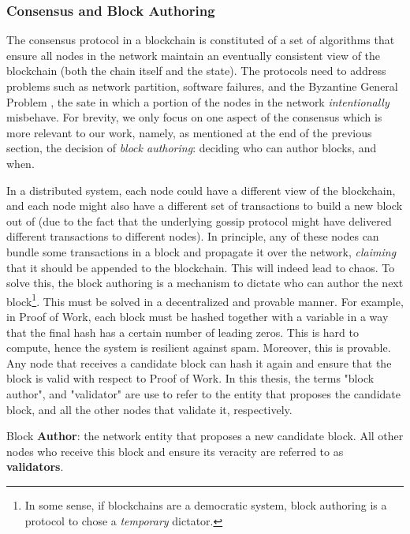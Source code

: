 \subsubsection{Consensus and Block Authoring} \label{chap_bg:subsec:consensus_authorship}

The consensus protocol in a blockchain is constituted of a set of algorithms that ensure all nodes
in the network maintain an eventually consistent view of the blockchain (both the chain itself and
the state). The protocols need to address problems such as network partition, software failures, and
the Byzantine General Problem \cite{lamportByzantineGeneralsProblem1982}, the sate in which a
portion of the nodes in the network \textit{intentionally} misbehave. For brevity, we only focus on
one aspect of the consensus which is more relevant to our work, namely, as mentioned at the end of
the previous section, the decision of \textit{block authoring}: deciding who can author blocks, and
when.

In a distributed system, each node could have a different view of the blockchain, and each node
might also have a different set of transactions to build a new block out of (due to the fact that
the underlying gossip protocol might have delivered different transactions to different nodes). In
principle, any of these nodes can bundle some transactions in a block and propagate it over the
network, \textit{claiming} that it should be appended to the blockchain. This will indeed lead to
chaos. To solve this, the block authoring is a mechanism to dictate who can author the next
block\footnote{In some sense, if blockchains are a democratic system, block authoring is a protocol
to chose a \textit{temporary} dictator.}. This must be solved in a decentralized and provable
manner. For example, in Proof of Work, each block must be hashed together with a variable in a way
that the final hash has a certain number of leading zeros. This is hard to compute, hence the system
is resilient against spam. Moreover, this is provable. Any node that receives a candidate block can
hash it again and ensure that the block is valid with respect to Proof of Work. In this thesis, the
terms "block author", and "validator" are use to refer to the  entity that proposes the candidate
block, and all the other nodes that validate it, respectively.


\begin{definition} \label{def:auhtor_validator} Block \textbf{Author}: the network entity that
	proposes a new candidate block. All other nodes who  receive this block and ensure its veracity
	are referred to as \textbf{validators}.
\end{definition}

